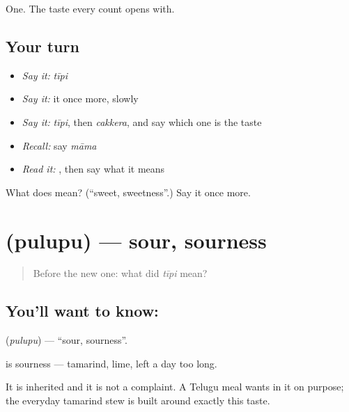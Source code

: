 \begin{grammarlens}[title={What you've built}]
One. The taste every count opens with.
\end{grammarlens}

\subsection*{Your turn}
\begin{itemize}
\raggedright
  \item \emph{Say it:} \emph{tīpi}
  \item \emph{Say it:} it once more, slowly
  \item \emph{Say it:} \emph{tīpi}, then \emph{cakkera}, and say which one is the taste
  \item \emph{Recall:} say \emph{māma}
  \item \emph{Read it:} \textbf{}, then say what it means
\end{itemize}

\begin{tcolorbox}[breakable,colback=teal!4,colframe=teal!35!black,title={Before you move on}]
What does  mean? (\textquotedblleft{}sweet, sweetness\textquotedblright{}.) Say it once more.
\end{tcolorbox}
\section[\texorpdfstring{\te{పులుపు} (pulupu)}{పులుపు (pulupu)}]{ (pulupu) — sour, sourness}

\label{lesson:TE-C73-sour}



\begin{quote}
Before the new one: what did \emph{tīpi} mean?
\end{quote}

\subsection*{You'll want to know: }
\textbf{} (\emph{pulupu}) — \textquotedblleft{}sour, sourness\textquotedblright{}.

 is sourness — tamarind, lime,  left a day too long.

It is inherited and it is not a complaint. A Telugu meal wants  in it on purpose; the everyday tamarind stew is built around exactly this taste.

